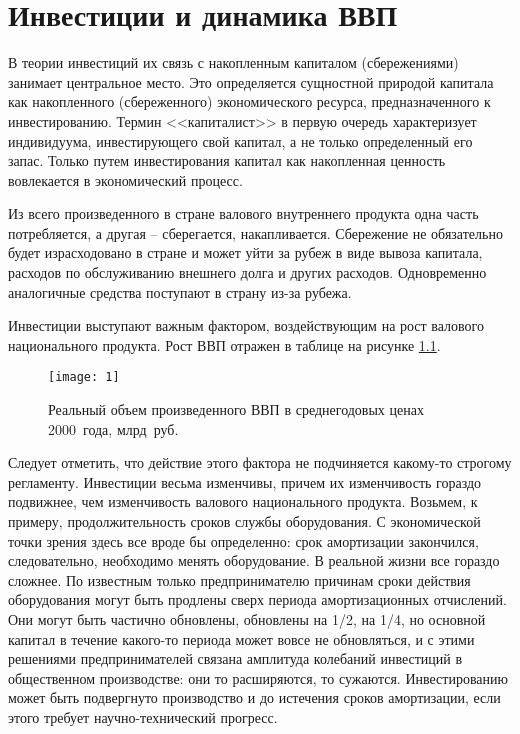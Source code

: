 \chapter{Инвестиции и динамика ВВП}

В теории инвестиций их связь с накопленным капиталом (сбережениями) занимает
центральное место. Это определяется сущностной природой капитала как
накопленного (сбереженного) экономического ресурса, предназначенного к
инвестированию. Термин <<капиталист>> в первую очередь характеризует
индивидуума, инвестирующего свой капитал, а не только определенный его запас.
Только путем инвестирования капитал как накопленная ценность вовлекается в
экономический процесс.

Из всего произведенного в стране валового внутреннего продукта одна часть
потребляется, а другая -- сберегается, накапливается. Сбережение не обязательно
будет израсходовано в стране и может уйти за рубеж в виде вывоза капитала,
расходов по обслуживанию внешнего долга и других расходов. Одновременно
аналогичные средства поступают в страну из-за рубежа.

Инвестиции выступают важным фактором, воздействующим на рост валового
национального продукта. Рост ВВП отражен в таблице на рисунке \ref{pic_tab}.
\begin{figure}[h!]
    \centering
    \texttt{[image: 1]}
    \caption{Реальный объем произведенного ВВП в среднегодовых ценах 2000~года,
    млрд~руб.}
    \label{pic_tab}
\end{figure}

Следует отметить, что действие этого фактора не подчиняется какому-то строгому
регламенту. Инвестиции весьма изменчивы, причем их изменчивость гораздо
подвижнее, чем изменчивость валового национального продукта. Возьмем, к
примеру, продолжительность сроков службы оборудования. С экономической точки
зрения здесь все вроде бы определенно: срок амортизации закончился,
следовательно, необходимо менять оборудование. В реальной жизни все гораздо
сложнее. По известным только предпринимателю причинам сроки действия
оборудования могут быть продлены сверх периода амортизационных отчислений. Они
могут быть частично обновлены, обновлены на 1/2, на 1/4, но основной капитал в
течение какого-то периода может вовсе не обновляться, и с этими решениями
предпринимателей связана амплитуда колебаний инвестиций в общественном
производстве: они то расширяются, то сужаются. Инвестированию может быть
подвергнуто производство и до истечения сроков амортизации, если этого требует
научно-технический прогресс.

